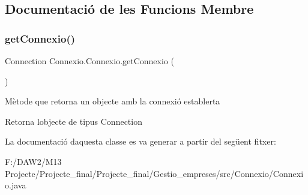 \subsection{Documentació de les Funcions Membre}
\mbox{\label{class_connexio_1_1_connexio_a32d5077179258391ba99699a87a4cff2}} 
\subsubsection{\texorpdfstring{getConnexio()}{getConnexio()}}
{\footnotesize\ttfamily Connection Connexio.\+Connexio.\+get\+Connexio (\begin{DoxyParamCaption}{ }\end{DoxyParamCaption})}

Mètode que retorna un objecte amb la connexió establerta \begin{DoxyReturn}{Retorna}
l\textquotesingle{}objecte de tipus Connection 
\end{DoxyReturn}


La documentació d\textquotesingle{}aquesta classe es va generar a partir del següent fitxer\+:\begin{DoxyCompactItemize}
\item 
F\+:/\+D\+A\+W2/\+M13 Projecte/\+Projecte\+\_\+final/\+Projecte\+\_\+final/\+Gestio\+\_\+empreses/src/\+Connexio/Connexio.\+java\end{DoxyCompactItemize}
